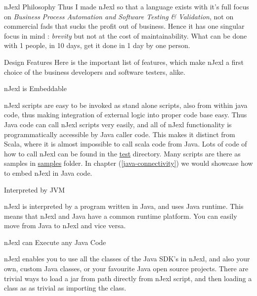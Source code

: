 \begin{section}{nJexl Philosophy}
Thus I made nJexl so that a language exists with it's full focus on \emph{Business Process Automation and Software Testing \& Validation},
not on commercial fads that sucks the profit out of business. Hence it has one singular focus in mind : \emph{brevity} but not at the cost of maintainability. What can be done with 1 people, in 10 days, get it done in 1 day by one person.

\end{section}

\begin{section}{Design Features}
Here is the important list of features, which make nJexl a first choice of the business developers and software testers, alike.

\begin{subsection}{nJexl is Embeddable}

nJexl scripts are easy to be invoked as stand alone scripts, also from within java code, 
thus making integration of external logic into proper code base easy. Thus Java code
can call nJexl scripts very easily, and all of nJexl functionality is programmatically 
accessible by Java caller code. This makes it distinct from Scala, where it is almost impossible
to call scala code from Java. Lots of code of how to call nJexl can be found 
in the \href{https://github.com/nmondal/njexl/tree/master/lang/src/test/java/com/noga/njexl/lang}{test} directory. 
Many scripts are there as samples in \href{https://github.com/nmondal/njexl/tree/master/lang/samples}{samples} folder.
In chapter (\ref{java-connectivity}) we would showcase how to embed nJexl in Java code.
\end{subsection}

\begin{subsection}{Interpreted by JVM}

nJexl is interpreted by a program written in Java, and uses Java runtime. 
This means that nJexl and Java have a common runtime platform. 
You can easily move from Java to nJexl and vice versa.

\end{subsection}

\begin{subsection}{nJexl can Execute any Java Code}

nJexl enables you to use all the classes of the Java SDK's in nJexl, and also your own, custom Java classes, or your favourite Java open source projects. There are trivial ways to load a jar from path directly from nJexl script, and then loading a class as as trivial 
as importing the class.


\end{subsection}
\end{section}
